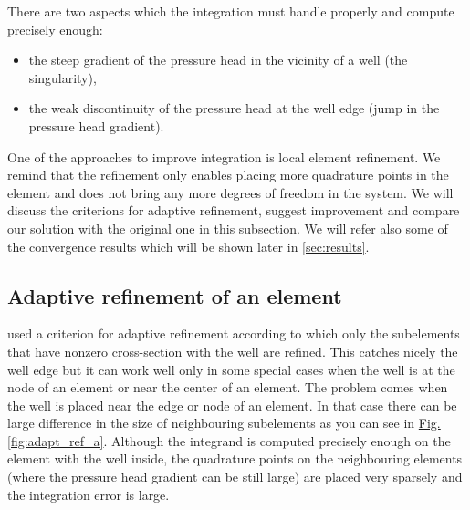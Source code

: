 \documentclass[preprint,12pt,authoryear]{elsarticle}
\newcommand{\fig}[1]{\hyperref[#1]{Fig.\ref{#1}}}
\begin{document}
There are two aspects which the integration must handle properly and compute precisely enough:
\begin{itemize}
  \item the steep gradient of the pressure head in the vicinity of a well (the singularity),
  \item the weak discontinuity of the pressure head at the well edge (jump in the pressure head gradient).
\end{itemize}

One of the approaches to improve integration is local element refinement. We remind that the refinement only enables
placing more quadrature points in the element and does not bring any more degrees of freedom in the 
system. We will discuss the criterions for adaptive refinement, suggest improvement and compare our solution
with the original one in this subsection. We will refer also some of the convergence results which will be 
shown later in \ref{sec:results}.

\subsection{Adaptive refinement of an element}
\label{sec:refinement_element}

\cite{gracie} used a criterion for adaptive refinement according to which only the subelements 
that have nonzero cross-section with the well are refined. This catches nicely the well edge but it can work 
well only in some special cases when the well is at the node of an element or near the center of an element. 
The problem comes when the well is placed near the edge or node of an element. In that case there can be
large difference in the size of neighbouring subelements as you can see in \fig{fig:adapt_ref_a}. Although
the integrand is computed precisely enough on the element with the well inside, the quadrature points on the
neighbouring elements (where the pressure head gradient can be still large) are placed very sparsely 
and the integration error is large.
\end{document}
